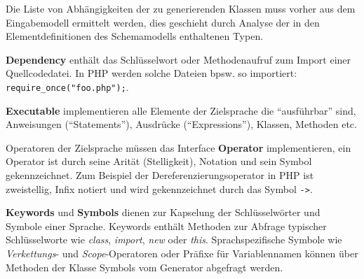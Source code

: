 Die Liste von Abhängigkeiten der zu generierenden Klassen muss vorher aus dem Eingabemodell ermittelt werden, dies geschieht durch Analyse der in den Elementdefinitionen des Schemamodells enthaltenen Typen. 

\textbf{Dependency} enthält das Schlüsselwort oder Methodenaufruf zum Import einer Quellcodedatei. In PHP werden solche Dateien bpsw. so importiert: \texttt{require\_once("foo.php");}.

\textbf{Executable} implementieren alle Elemente der Zielsprache die \enquote{ausführbar} sind, Anweisungen (\enquote{Statements}), Ausdrücke (\enquote{Expressions}), Klassen, Methoden etc.

Operatoren der Zielsprache müssen das Interface \textbf{Operator} implementieren, ein Operator ist durch seine Arität (Stelligkeit), Notation und sein Symbol gekennzeichnet. Zum Beispiel der Dereferenzierungsoperator in PHP ist zweistellig, Infix notiert und wird gekennzeichnet durch das Symbol \texttt{->}.

\textbf{Keywords} und \textbf{Symbols} dienen zur Kapselung der Schlüsselwörter und Symbole einer Sprache. Keywords enthält Methoden zur Abfrage typischer Schlüsselworte wie \emph{class}, \emph{import}, \emph{new} oder \emph{this}. Sprachspezifische Symbole wie \emph{Verkettungs}- und \emph{Scope}-Operatoren oder Präfixe für Variablennamen können über Methoden der Klasse Symbols vom Generator abgefragt werden.
